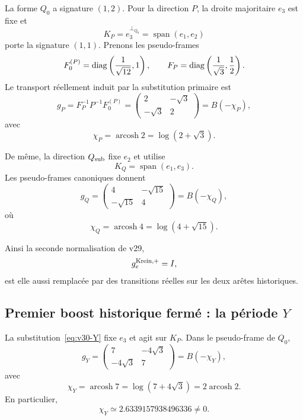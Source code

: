 \documentclass[11pt,a4paper]{article}
\begin{document}
La forme $Q_0$ a signature $(1,2)$. Pour la direction $P$, la droite majoritaire $e_3$ est fixe et
\[
 K_P=e_3^{\perp_{Q_0}}=\operatorname{span}(e_1,e_2)
\]
porte la signature $(1,1)$. Prenons les pseudo-frames
\[
 F_0^{(P)}
 =
 \operatorname{diag}
 \left(
 {1\over\sqrt{12}},1
 \right),
 \qquad
 F_P
 =
 \operatorname{diag}
 \left(
 {1\over\sqrt3},{1\over2}
 \right).
\]
Le transport réellement induit par la substitution primaire est
\begin{equation}\label{eq:v30-gP}
 \boxed{
 g_P
 =
 F_P^{-1}P^{-1}F_0^{(P)}
 =
 \begin{pmatrix}
 2&-\sqrt3\\
 -\sqrt3&2
 \end{pmatrix}
 =
 B(-\chi_P),}
\end{equation}
avec
\[
 \boxed{
 \chi_P
 =
 \operatorname{arcosh}2
 =
 \log(2+\sqrt3).}
\]

De même, la direction $Q_{\rm sub}$ fixe $e_2$ et utilise
\[
 K_Q=\operatorname{span}(e_1,e_3).
\]
Les pseudo-frames canoniques donnent
\begin{equation}\label{eq:v30-gQ}
 \boxed{
 g_Q
 =
 \begin{pmatrix}
 4&-\sqrt{15}\\
 -\sqrt{15}&4
 \end{pmatrix}
 =
 B(-\chi_Q),}
\end{equation}
où
\[
 \boxed{
 \chi_Q
 =
 \operatorname{arcosh}4
 =
 \log(4+\sqrt{15}).}
\]

Ainsi la seconde normalisation de v29,
\[
 g_e^{\rm Krein,+}=I,
\]
est elle aussi remplacée par des transitions réelles sur les deux arêtes historiques.

\subsection{Premier boost historique fermé : la période \texorpdfstring{$Y$}{Y}}

La substitution~\eqref{eq:v30-Y} fixe $e_3$ et agit sur $K_P$. Dans le pseudo-frame de $Q_0$,
\begin{equation}\label{eq:v30-gY}
 \boxed{
 g_Y
 =
 \begin{pmatrix}
 7&-4\sqrt3\\
 -4\sqrt3&7
 \end{pmatrix}
 =
 B(-\chi_Y),}
\end{equation}
avec
\begin{equation}\label{eq:v30-chiY}
 \boxed{
 \chi_Y
 =
 \operatorname{arcosh}7
 =
 \log(7+4\sqrt3)
 =
 2\operatorname{arcosh}2.}
\end{equation}
En particulier,
\[
 \boxed{
 \chi_Y\simeq2.6339157938496336\neq0.}
\]
\end{document}

